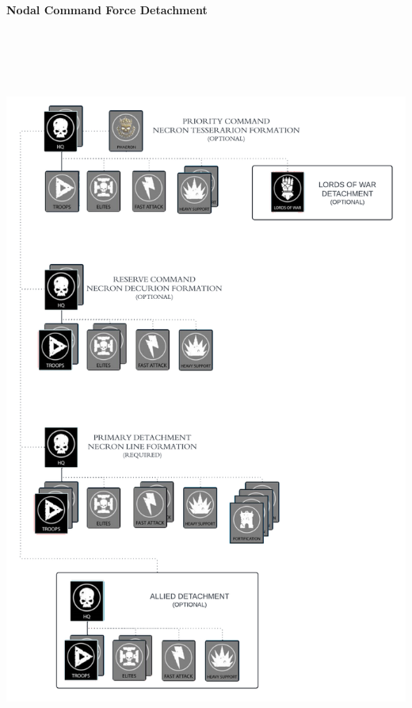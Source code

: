 \newpage
{
\centering
\textbf{Nodal Command Force Detachment}

\includegraphics[width=470pt, height=700pt]{Org chart.png}

}
